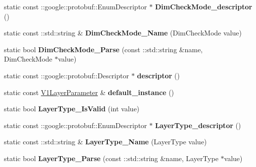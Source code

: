 \begin{DoxyCompactItemize}
static const \+::google\+::protobuf\+::\+Enum\+Descriptor $\ast$ {\bfseries Dim\+Check\+Mode\+\_\+descriptor} ()
\item 
\mbox{\label{classcaffe_1_1_v1_layer_parameter_a3be01204bde8d8913476148ee86f20c5}} 
static const \+::std\+::string \& {\bfseries Dim\+Check\+Mode\+\_\+\+Name} (Dim\+Check\+Mode value)
\item 
\mbox{\label{classcaffe_1_1_v1_layer_parameter_a50080bb786404e703ea929af876289a7}} 
static bool {\bfseries Dim\+Check\+Mode\+\_\+\+Parse} (const \+::std\+::string \&name, Dim\+Check\+Mode $\ast$value)
\item 
\mbox{\label{classcaffe_1_1_v1_layer_parameter_a84c6910329fcd11c4241181a45374d73}} 
static const \+::google\+::protobuf\+::\+Descriptor $\ast$ {\bfseries descriptor} ()
\item 
\mbox{\label{classcaffe_1_1_v1_layer_parameter_a6e097cc603ac4de9a849202405fcd3ce}} 
static const \mbox{\hyperlink{classcaffe_1_1_v1_layer_parameter}{V1\+Layer\+Parameter}} \& {\bfseries default\+\_\+instance} ()
\item 
\mbox{\label{classcaffe_1_1_v1_layer_parameter_a329f9f5cbb65a20c0691c0bdb3e8b20b}} 
static bool {\bfseries Layer\+Type\+\_\+\+Is\+Valid} (int value)
\item 
\mbox{\label{classcaffe_1_1_v1_layer_parameter_a39a0cb8e50c3458731da531508a6e24e}} 
static const \+::google\+::protobuf\+::\+Enum\+Descriptor $\ast$ {\bfseries Layer\+Type\+\_\+descriptor} ()
\item 
\mbox{\label{classcaffe_1_1_v1_layer_parameter_a06aea9acb8f1825d4a83b6bc930246d6}} 
static const \+::std\+::string \& {\bfseries Layer\+Type\+\_\+\+Name} (Layer\+Type value)
\item 
\mbox{\label{classcaffe_1_1_v1_layer_parameter_a4c26e27af24bb6fae49cedb85800effe}} 
static bool {\bfseries Layer\+Type\+\_\+\+Parse} (const \+::std\+::string \&name, Layer\+Type $\ast$value)

\end{DoxyCompactItemize}
